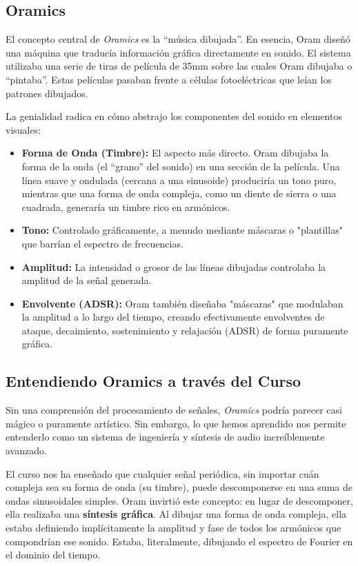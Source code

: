 \documentclass[paper=letter, fontsize=11pt, draft=false]{scrartcl}
\numberwithin{equation}{problemcounter} %
\numberwithin{figure}{problemcounter} %
\numberwithin{table}{problemcounter} %
\numberwithin{subsection}{problemcounter}
\begin{document}
\subsection{Oramics}

\noindent
El concepto central de \textit{Oramics} es la ``música dibujada''. En esencia, Oram diseñó una máquina que traducía información gráfica directamente en sonido. El sistema utilizaba una serie de tiras de película de 35mm sobre las cuales Oram dibujaba o ``pintaba''. Estas películas pasaban frente a células fotoeléctricas que leían los patrones dibujados.

La genialidad radica en cómo abstrajo los componentes del sonido en elementos visuales:

\begin{itemize}
    \item \textbf{Forma de Onda (Timbre):} El aspecto más directo. Oram dibujaba la forma de la onda (el ``grano'' del sonido) en una sección de la película. Una línea suave y ondulada (cercana a una sinusoide) produciría un tono puro, mientras que una forma de onda compleja, como un diente de sierra o una cuadrada, generaría un timbre rico en armónicos.
    \item \textbf{Tono:} Controlado gráficamente, a menudo mediante máscaras o "plantillas" que barrían el espectro de frecuencias.
    \item \textbf{Amplitud:} La intensidad o grosor de las líneas dibujadas controlaba la amplitud de la señal generada.
    \item \textbf{Envolvente (ADSR):} Oram también diseñaba "máscaras" que modulaban la amplitud a lo largo del tiempo, creando efectivamente envolventes de ataque, decaimiento, sostenimiento y relajación (ADSR) de forma puramente gráfica.
\end{itemize}

\subsection{Entendiendo Oramics a través del Curso}

Sin una comprensión del procesamiento de señales, \textit{Oramics} podría parecer casi mágico o puramente artístico. Sin embargo, lo que hemos aprendido nos permite entenderlo como un sistema de ingeniería y síntesis de audio increíblemente avanzado.

El curso nos ha enseñado que cualquier señal periódica, sin importar cuán compleja sea su forma de onda (su timbre), puede descomponerse en una suma de ondas sinusoidales simples. Oram invirtió este concepto: en lugar de descomponer, ella realizaba una \textbf{síntesis gráfica}. Al dibujar una forma de onda compleja, ella estaba definiendo implícitamente la amplitud y fase de todos los armónicos que compondrían ese sonido. Estaba, literalmente, dibujando el espectro de Fourier en el dominio del tiempo.
\end{document}
